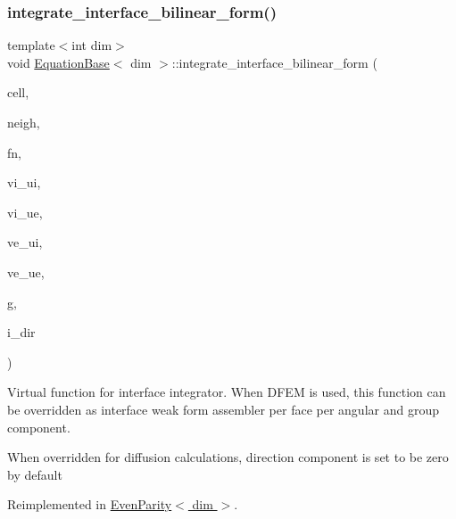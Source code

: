 \subsubsection{\texorpdfstring{integrate\+\_\+interface\+\_\+bilinear\+\_\+form()}{integrate\_interface\_bilinear\_form()}}
{\footnotesize\ttfamily template$<$int dim$>$ \\
void \hyperlink{class_equation_base}{Equation\+Base}$<$ dim $>$\+::integrate\+\_\+interface\+\_\+bilinear\+\_\+form (\begin{DoxyParamCaption}\item[{typename Do\+F\+Handler$<$ dim $>$\+::active\+\_\+cell\+\_\+iterator \&}]{cell,  }\item[{typename Do\+F\+Handler$<$ dim $>$\+::cell\+\_\+iterator \&}]{neigh,  }\item[{unsigned int \&}]{fn,  }\item[{Full\+Matrix$<$ double $>$ \&}]{vi\+\_\+ui,  }\item[{Full\+Matrix$<$ double $>$ \&}]{vi\+\_\+ue,  }\item[{Full\+Matrix$<$ double $>$ \&}]{ve\+\_\+ui,  }\item[{Full\+Matrix$<$ double $>$ \&}]{ve\+\_\+ue,  }\item[{const unsigned int \&}]{g,  }\item[{const unsigned int \&}]{i\+\_\+dir }\end{DoxyParamCaption})\hspace{0.3cm}{\ttfamily [virtual]}}



Virtual function for interface integrator. When D\+F\+EM is used, this function can be overridden as interface weak form assembler per face per angular and group component. 

When overridden for diffusion calculations, direction component is set to be zero by default 

Reimplemented in \hyperlink{class_even_parity_a0a6674c14f34f22c8ff383aee81ffabf}{Even\+Parity$<$ dim $>$}.

\mbox{\label{class_equation_base_aca5998c1afd2b89ee93d3fbbfde7f3d0}} 
